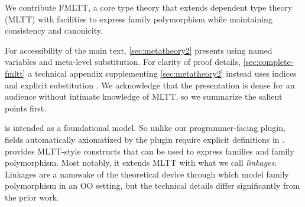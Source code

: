 We contribute \ac{FMLTT}, a core type theory that extends
\citeauthor{martin1982constructive} dependent type theory (MLTT)
with facilities to express family polymorphism
while maintaining consistency and canonicity.
%

For accessibility of the main text, \cref{sec:metatheory2} presents \TT using
named variables and meta-level substitution.
For clarity of proof details,
\ifreport
\cref{sec:complete-fmltt}
\else
a technical appendix \cite{fpop-tr}
\fi
supplementing \cref{sec:metatheory2}
instead uses \citeauthor{debruijn1964} indices and explicit substitution \cite{abadi1989subst}.
%
We acknowledge that the presentation is dense for an audience
without intimate knowledge of MLTT, so we summarize the salient points first.


\TT is intended as a foundational model. So unlike our programmer-facing plugin,
fields automatically axiomatized by the plugin require explicit definitions in \TT.
%
\TT provides MLTT-style constructs that can be used to express families and
family polymorphism. %
%
Most notably, it extends MLTT with what we call \emph{linkages}.
Linkages are a namesake of the theoretical device through which \citet{zm2017} model
family polymorphism in an OO setting, but the technical details differ significantly from the prior work.

